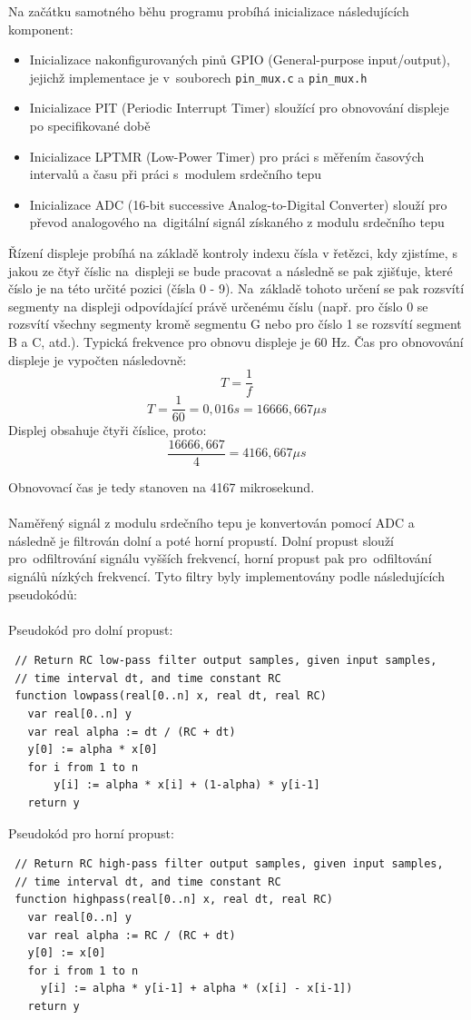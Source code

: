 \documentclass[a4paper, 11pt]{article}
\begin{document}
Na začátku samotného běhu programu probíhá inicializace následujících komponent:
\begin{itemize}
    \item Inicializace nakonfigurovaných pinů GPIO (General-purpose input/output), jejichž implementace je v~souborech  \verb|pin_mux.c| a \verb|pin_mux.h|
    \item Inicializace PIT (Periodic Interrupt Timer) sloužící pro obnovování displeje po specifikované době
    \item Inicializace LPTMR (Low-Power Timer) pro práci s měřením časových intervalů a času při práci s~modulem srdečního tepu
    \item Inicializace ADC (16-bit successive Analog-to-Digital Converter) slouží pro převod analogového na~digitální signál získaného z modulu srdečního tepu
\end{itemize}

Řízení displeje probíhá na základě kontroly indexu čísla v řetězci, kdy zjistíme, s jakou ze čtyř číslic na~displeji se bude pracovat a následně se pak zjišťuje, které číslo je na této určité pozici (čísla 0 - 9). Na~základě tohoto určení se pak rozsvítí segmenty na displeji odpovídající právě určenému číslu (např. pro číslo 0 se rozsvítí všechny segmenty kromě segmentu G nebo pro číslo 1 se rozsvítí segment B a C, atd.). Typická frekvence pro obnovu displeje je 60 Hz. Čas pro obnovování displeje je vypočten následovně:\\
$$T = \frac{1}{f}$$
$$T = \frac{1}{60} = 0,016 s = 16666,667 \mu s$$
Displej obsahuje čtyři číslice, proto:\\
$$\frac{16666,667}{4} = 4166,667 \mu s$$

Obnovovací čas je tedy stanoven na 4167 mikrosekund. \\\\
Naměřený signál z modulu srdečního tepu je konvertován pomocí ADC a následně je filtrován dolní a poté horní propustí. Dolní propust slouží pro~odfiltrování signálu vyšších frekvencí, horní propust pak pro~odfiltování signálů nízkých frekvencí. Tyto filtry byly implementovány podle následujících pseudokódů:\\\\
Pseudokód pro dolní propust:\cite{Lowpass:web}
\begin{lstlisting}
 // Return RC low-pass filter output samples, given input samples,
 // time interval dt, and time constant RC
 function lowpass(real[0..n] x, real dt, real RC)
   var real[0..n] y
   var real alpha := dt / (RC + dt)
   y[0] := alpha * x[0]
   for i from 1 to n
       y[i] := alpha * x[i] + (1-alpha) * y[i-1]
   return y
\end{lstlisting}
Pseudokód pro horní propust:\cite{Highpass:web}
\begin{lstlisting}
 // Return RC high-pass filter output samples, given input samples,
 // time interval dt, and time constant RC
 function highpass(real[0..n] x, real dt, real RC)
   var real[0..n] y
   var real alpha := RC / (RC + dt)
   y[0] := x[0]
   for i from 1 to n
     y[i] := alpha * y[i-1] + alpha * (x[i] - x[i-1])
   return y
\end{lstlisting}
\end{document}
